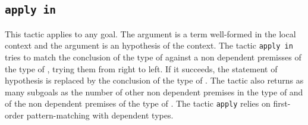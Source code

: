 %
%

\subsection{{\tt apply {\term} in {\ident}}
}

This tactic applies to any goal.  The argument {\term} is a term
well-formed in the local context and the argument {\ident} is an
hypothesis of the context.  The tactic {\tt apply {\term} in {\ident}}
tries to match the conclusion of the type of {\ident} against a non
dependent premisses of the type of {\term}, trying them from right to
left.  If it succeeds, the statement of hypothesis {\ident} is
replaced by the conclusion of the type of {\ident}. The tactic also
returns as many subgoals as the number of other non dependent premises
in the type of {\term} and of the non dependent premises of the type
of {\ident}.  The tactic {\tt apply} relies on first-order
pattern-matching with dependent types.


